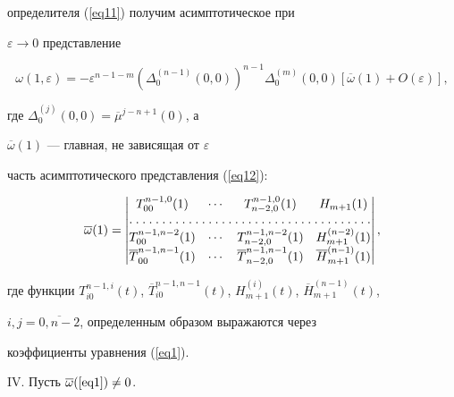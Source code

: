 определителя (\ref{eq11}) получим асимптотическое при 


$\varepsilon \to 0$ представление


\begin{equation}


\label{eq12}


\omega(1,\varepsilon)=-\varepsilon^{n-1-m}


(\Delta _{0}^{(n-1)}(0,0))^{n-1}\Delta _{0}^{(m)}(0,0)[\overline{\omega}(1)+


O(\varepsilon)],


\end{equation}


где $\Delta _{0}^{(j)}(0,0)=\overline{\mu}^{j-n+1}(0)$, а 


$\overline {\omega}(1)$ --- главная, не зависящая от $\varepsilon$ 


часть асимптотического представления (\ref{eq12}):


\begin{equation}


\label{eq13}


\overline {\omega}(1)=\begin{vmatrix}


T_{00}^{n-1,0}(1)& \dotsb & T_{n-2,0}^{n-1,0}(1)& H_{m+1}(1) \\ 


\hdotsfor[1.5]{4}\\


T_{00}^{n-1,n-2}(1) &\dotsb & T_{n-2,0}^{n-1,n-2}(1) & H_{m+1}^{(n-2)}(1)\\ 


\overline{T}_{00}^{n-1,n-1}(1)& \dotsb &\overline{T}_{n-2,0}^{n-1,n-1}(1)& 


\overline{H}_{m+1}^{(n-1)}(1) 


\end{vmatrix},


\end{equation}


где функции $T_{i0}^{n - 1,i} (t)$, $\overline {T}_{i0}^{n - 1,n - 1} 


(t)$, $H_{m + 1}^{(i)} (t)$, $\overline {H}_{m + 1}^{(n - 1)} (t)$, 


$i,j = \overline {0,n - 2}$, определенным образом выражаются через 


коэффициенты уравнения (\ref{eq1}).





IV. Пусть $\overline {\omega} (\ref{eq1}) \ne 0$.





